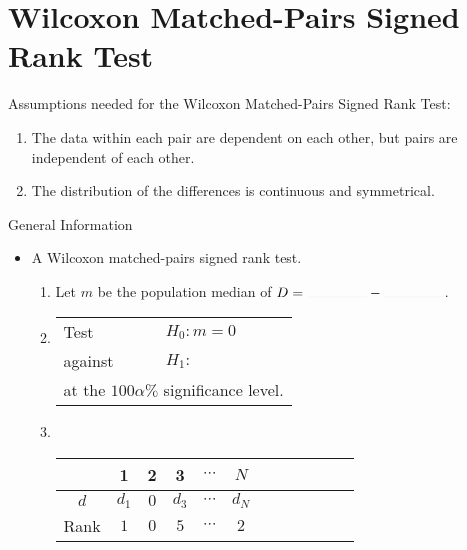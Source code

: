 \section{Wilcoxon Matched-Pairs Signed Rank Test}
\begin{note}
  Assumptions needed for the Wilcoxon Matched-Pairs Signed Rank Test:
  \begin{enumerate}
    \item The data within each pair are dependent on each other, but pairs are independent of each other.
    \item The distribution of the differences is continuous and symmetrical.
  \end{enumerate}
\end{note}
\begin{stbox}{General Information}
  \begin{itemize}
    \item A Wilcoxon matched-pairs signed rank test. 
    \begin{enumerate}
      \item Let \(m\) be the population median of \(D=\rule{1.5cm}{0.01mm}-\rule{1.5cm}{0.01mm}\).
      \item 
      \begin{tabular}{|ll|}
        \hline
        Test & \(H_0\colon m=0\)\\
        against &\(H_1\colon\) 
        \begin{enumerate*}[itemjoin={\quad}]
          \item \(m<\highlight[yellow]{0}\),
          \item \(m\neq \highlight[yellow]{0}\),\quad or
          \item \(m>\highlight[yellow]{0}\),
        \end{enumerate*}\\
        \multicolumn{2}{|l|}{at the \(100\alpha\%\) significance level.}\\
        \hline
      \end{tabular}
      \item ~
      \begin{table}[H]
        \centering
        \begin{tabular}{|Sc|Sc|Sc|Sc|Sc|Sc|}
           & 1 & 2 & 3 & \(\cdots\) & \(N\)\\
          \hline 
          \(d\) & \(d_1\) & \(0\) & \(d_3\) & \(\cdots\) & \(d_N\)\\
          \hline
          Rank & \(1\) & \(0\) & \(5\) & \(\cdots\) & \(2\)\\

\end{tabular}
\end{table}
\end{enumerate}
\end{itemize}
\end{stbox}
